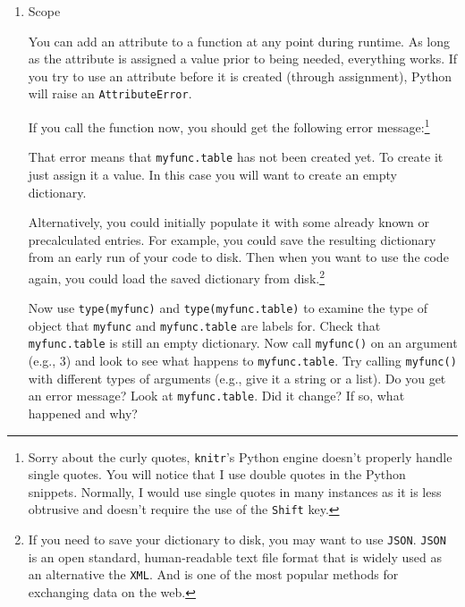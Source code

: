 \documentclass{article}
\begin{document}
\begin{enumerate}

\item Scope

You can add an attribute to a function at any point during runtime.  As long as
the attribute is assigned a value prior to being needed, everything works.  If
you try to use an attribute before it is created (through assignment), Python
will raise an \texttt{AttributeError}.


If you call the function now, you should get the following error
message:\footnote{ Sorry about the curly quotes, \texttt{knitr}'s Python engine
doesn't properly handle single quotes.  You will notice that I use double
quotes in the Python snippets.  Normally, I would use single quotes in many
instances as it is less obtrusive and doesn't require the use of the
\texttt{Shift} key.}


That error means that \texttt{myfunc.table} has not been created yet.  To
create it just assign it a value.  In this case you will want to create
an empty dictionary.


Alternatively, you could initially populate it with some already known or
precalculated entries.  For example, you could save the resulting dictionary
from an early run of your code to disk.  Then when you want to use the
code again, you could load the saved dictionary from disk.\footnote{If you
need to save your dictionary to disk, you may want to use \texttt{JSON}.
\texttt{JSON} is an open standard, human-readable text file format that
is widely used as an alternative the \texttt{XML}. And is one of the most
popular methods for exchanging data on the web.}

Now use \texttt{type(myfunc)} and \texttt{type(myfunc.table)} to examine the
type of object that \texttt{myfunc} and \texttt{myfunc.table} are labels for.
Check that \texttt{myfunc.table} is still an empty dictionary.  Now call
\texttt{myfunc()} on an argument (e.g., 3) and look to see what happens to
\texttt{myfunc.table}.  Try calling \texttt{myfunc()} with different types of
arguments (e.g., give it a string or a list).  Do you get an error message?
Look at \texttt{myfunc.table}.  Did it change?  If so, what happened and why?


\end{enumerate}
\end{document}
